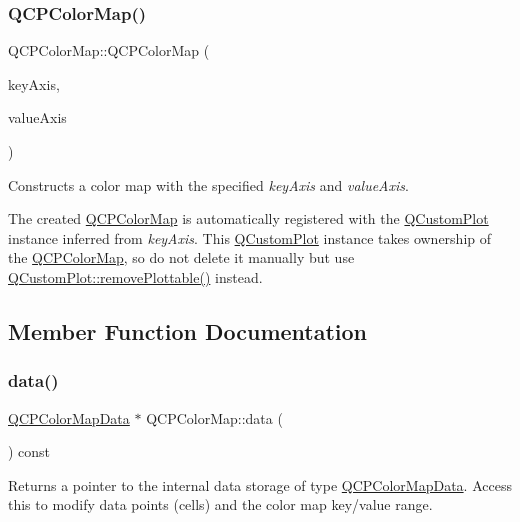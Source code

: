 \subsubsection{\texorpdfstring{Q\+C\+P\+Color\+Map()}{QCPColorMap()}}
{\footnotesize\ttfamily Q\+C\+P\+Color\+Map\+::\+Q\+C\+P\+Color\+Map (\begin{DoxyParamCaption}\item[{\hyperlink{classQCPAxis}{Q\+C\+P\+Axis} $\ast$}]{key\+Axis,  }\item[{\hyperlink{classQCPAxis}{Q\+C\+P\+Axis} $\ast$}]{value\+Axis }\end{DoxyParamCaption})\hspace{0.3cm}{\ttfamily [explicit]}}

Constructs a color map with the specified {\itshape key\+Axis} and {\itshape value\+Axis}.

The created \hyperlink{classQCPColorMap}{Q\+C\+P\+Color\+Map} is automatically registered with the \hyperlink{classQCustomPlot}{Q\+Custom\+Plot} instance inferred from {\itshape key\+Axis}. This \hyperlink{classQCustomPlot}{Q\+Custom\+Plot} instance takes ownership of the \hyperlink{classQCPColorMap}{Q\+C\+P\+Color\+Map}, so do not delete it manually but use \hyperlink{classQCustomPlot_af3dafd56884208474f311d6226513ab2}{Q\+Custom\+Plot\+::remove\+Plottable()} instead. 

\subsection{Member Function Documentation}
\mbox{\label{classQCPColorMap_a047d7eb3ae657f93f2f39b5e68b79451}} 
\subsubsection{\texorpdfstring{data()}{data()}}
{\footnotesize\ttfamily \hyperlink{classQCPColorMapData}{Q\+C\+P\+Color\+Map\+Data} $\ast$ Q\+C\+P\+Color\+Map\+::data (\begin{DoxyParamCaption}{ }\end{DoxyParamCaption}) const\hspace{0.3cm}{\ttfamily [inline]}}

Returns a pointer to the internal data storage of type \hyperlink{classQCPColorMapData}{Q\+C\+P\+Color\+Map\+Data}. Access this to modify data points (cells) and the color map key/value range.

